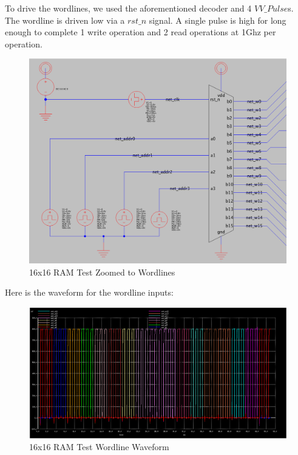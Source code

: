 \documentclass[a4paper]{article}
\begin{document}
To drive the wordlines, we used the aforementioned decoder and 4 $VV\_Pulse$s. The wordline is driven low via a $rst\_n$ signal. A single pulse is high for long enough to complete 1 write operation and 2 read operations at 1Ghz per operation.

\begin{figure}[H]
	\centering
	\includegraphics[scale=0.3]{memory16x16TestSchematicWordlines}
	\caption{16x16 RAM Test Zoomed to Wordlines}
	\label{fig:memory16x16TestSchematicWordlines}
\end{figure}

Here is the waveform for the wordline inputs:

\begin{figure}[H]
	\centering
	\includegraphics[scale=0.25]{memory16x16TestWaveformWordline}
	\caption{16x16 RAM Test Wordline Waveform}
	\label{fig:memory16x16TestWaveformWordline}
\end{figure}
\end{document}
